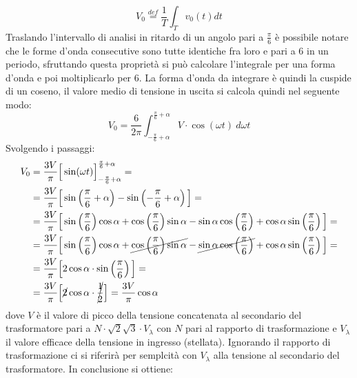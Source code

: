 \documentclass[a4paper,10pt]{article}
\begin{document}
\begin{equation}
 V_0 \stackrel{def}{=} \frac{1}{T}\int_T v_0(t) dt
 \label{eq:def_media_integrale}
\end{equation}
Traslando l'intervallo di analisi in ritardo di un angolo pari a \(\frac{\pi}{6}\) 
è possibile notare che le forme d'onda consecutive sono tutte identiche fra loro e pari %
a 6 in un periodo, sfruttando questa proprietà si può calcolare l'integrale per una forma d'onda e poi moltiplicarlo per 6.
La forma d'onda da integrare è quindi la cuspide di un coseno, il valore medio di 
tensione in uscita si calcola quindi nel seguente modo:
\begin{equation}
 V_0 = \frac{6}{2\pi} \int_{-\frac{\pi}{6}+\alpha}^{\frac{\pi}{6}+\alpha}
 V\cdot \cos (\omega t)\ d\omega t
\end{equation}
Svolgendo i passaggi:
\begin{align*}
 V_0 &= \frac{3V}{\pi} \Big[\sin(\omega t) \Big]_{-\frac{\pi}{6}+\alpha}^{\frac{\pi}{6}+\alpha} = \\
 &= \frac{3V}{\pi} \Big[\sin\left(\frac{\pi}{6}+\alpha \right) - \sin\left(-\frac{\pi}{6}+\alpha \right) \Big] = \\
 &= \frac{3V}{\pi} \Big[\sin\left(\frac{\pi}{6} \right)\cos\alpha + \cos\left(\frac{\pi}{6}\right)\sin\alpha - \sin\alpha\cos\left(\frac{\pi}{6}\right) + \cos\alpha\sin\left(\frac{\pi}{6}\right) \Big] = \\
 &=\frac{3V}{\pi}\Big[\sin\left(\frac{\pi}{6} \right)\cos\alpha + \cancel{\cos\left(\frac{\pi}{6}\right)\sin\alpha} - \cancel{\sin\alpha\cos\left(\frac{\pi}{6}\right)} + \cos\alpha\sin\left(\frac{\pi}{6}\right) \Big] = \\
 &= \frac{3V}{\pi} \Big[2\cos\alpha\cdot\sin\left(\frac{\pi}{6}\right) \Big]= \\
 &= \frac{3V}{\pi} \Big[\cancel{2}\cos\alpha\cdot\cancel{\frac{1}{2}}\Big] = \frac{3V}{\pi}\cos\alpha
\end{align*}
dove \(V\) è il valore di picco della tensione concatenata al secondario del trasformatore
pari a \(N\cdot\sqrt2\sqrt3\cdot V_{\lambda} \) con \(N\) pari al rapporto di trasformazione
e \(V_{\lambda} \) il valore efficace della tensione in ingresso (stellata).
Ignorando il rapporto di trasformazione ci si riferirà per semplcità con \(V_{\lambda}\)
alla tensione al secondario del trasformatore.
In conclusione si ottiene:
\end{document}
